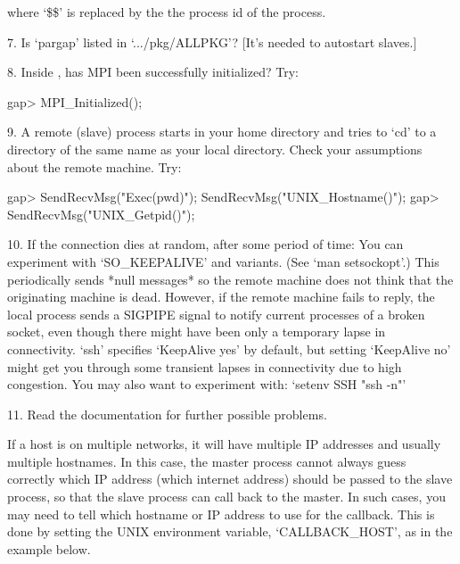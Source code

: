 \item{}
    where `\$\$' is replaced by the  the  process  id  of  the  {\ParGAP}
    process.

\item{7.}
    Is `pargap' listed in `.../pkg/ALLPKG'?
    [It's needed to autostart slaves.]

\item{8.}
    Inside {\ParGAP}, has MPI been successfully initialized?
    Try:  
    
\beginexample
gap> MPI_Initialized();
\endexample

\item{9.}
    A remote (slave) {\ParGAP} process starts in your home directory  and
    tries to `cd'  to  a  directory  of  the  same  name  as  your  local
    directory. Check your assumptions about the remote machine. Try:

\beginexample
gap> SendRecvMsg("Exec(pwd)"); SendRecvMsg("UNIX_Hostname()");
gap> SendRecvMsg("UNIX_Getpid()");
\endexample

\item{10.}
    If the connection dies at random, after some period of time:
    You can experiment with `SO_KEEPALIVE' and variants.  
    (See `man setsockopt'.)
    This periodically sends *null messages* so the  remote  machine  does
    not think that the originating  machine  is  dead.  However,  if  the
    remote machine fails to reply, the  local  process  sends  a  SIGPIPE
    signal to notify current processes of a broken  socket,  even  though
    there might have been only a temporary lapse in connectivity.
    `ssh' specifies `KeepAlive yes' by default, but setting `KeepAlive no'
    might get you through some transient lapses in  connectivity  due  to
    high congestion. 
    You may also want to experiment with: `setenv SSH "ssh -n"'

\item{11.}
    Read the documentation for further possible problems.

\endlist


If a host is on multiple networks, it will have multiple IP addresses and
usually multiple hostnames. In  this  case,  the  master  process  cannot
always guess correctly which IP address (which internet  address)  should
be passed to the slave process, so that the slave process can  call  back
to the master. In such cases,  you  may  need  to  tell  {\ParGAP}  which
hostname or IP address to use for the callback. This is done  by  setting
the UNIX environment variable, `CALLBACK_HOST', as in the example below.

